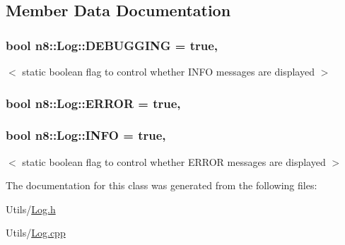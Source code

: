 \subsection{Member Data Documentation}
\hypertarget{classn8_1_1_log_a8169e40180cf2f69e873b7e91c71df3d}{
\subsubsection[{D\-E\-B\-U\-G\-G\-I\-N\-G}]{\setlength{\rightskip}{0pt plus 5cm}bool n8\-::\-Log\-::\-D\-E\-B\-U\-G\-G\-I\-N\-G = true\hspace{0.3cm}{\ttfamily [static]}, {\ttfamily [private]}}}\label{classn8_1_1_log_a8169e40180cf2f69e873b7e91c71df3d}
$<$ static boolean flag to control whether I\-N\-F\-O messages are displayed $>$ \hypertarget{classn8_1_1_log_a55e19b41d018681126fbdf7e67133120}{
\subsubsection[{E\-R\-R\-O\-R}]{\setlength{\rightskip}{0pt plus 5cm}bool n8\-::\-Log\-::\-E\-R\-R\-O\-R = true\hspace{0.3cm}{\ttfamily [static]}, {\ttfamily [private]}}}\label{classn8_1_1_log_a55e19b41d018681126fbdf7e67133120}
\hypertarget{classn8_1_1_log_a5784cbe90ebfbfc2c0293be4aefc37df}{
\subsubsection[{I\-N\-F\-O}]{\setlength{\rightskip}{0pt plus 5cm}bool n8\-::\-Log\-::\-I\-N\-F\-O = true\hspace{0.3cm}{\ttfamily [static]}, {\ttfamily [private]}}}\label{classn8_1_1_log_a5784cbe90ebfbfc2c0293be4aefc37df}
$<$ static boolean flag to control whether E\-R\-R\-O\-R messages are displayed $>$ 

The documentation for this class was generated from the following files\-:\begin{DoxyCompactItemize}
\item 
Utils/\hyperlink{_log_8h}{Log.\-h}\item 
Utils/\hyperlink{_log_8cpp}{Log.\-cpp}\end{DoxyCompactItemize}

